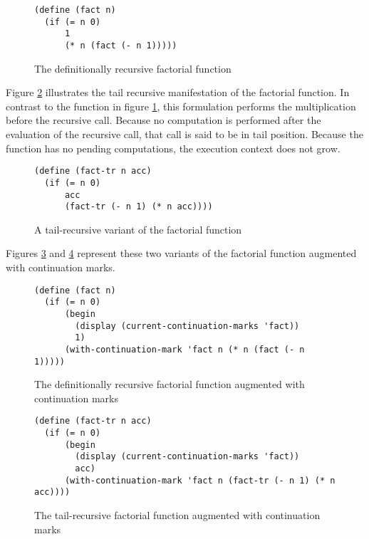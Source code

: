 \documentclass[ms]{byuprop}
\newcounter{definition}
\begin{document}
\begin{figure}
\begin{verbatim}
(define (fact n)
  (if (= n 0)
      1
      (* n (fact (- n 1)))))
\end{verbatim}
\caption{The definitionally recursive factorial function}
\label{fac-rec}
\end{figure}

Figure \ref{fac-tail-rec} illustrates the tail recursive manifestation of the factorial
function. In contrast to the function in figure \ref{fac-rec}, this formulation performs
the multiplication before the recursive call. Because no computation is performed after
the evaluation of the recursive call, that call is said to be in tail position. Because
the function has no pending computations, the execution context does not grow.

\begin{figure}
\begin{verbatim}
(define (fact-tr n acc)
  (if (= n 0)
      acc
      (fact-tr (- n 1) (* n acc))))
\end{verbatim}
\caption{A tail-recursive variant of the factorial function}
\label{fac-tail-rec}
\end{figure}

Figures \ref{fac-rec-cm} and \ref{fac-tail-rec-cm} represent these two variants of the
factorial function augmented with continuation marks.


\begin{figure}
\begin{verbatim}
(define (fact n)
  (if (= n 0)
      (begin
        (display (current-continuation-marks 'fact))
        1)
      (with-continuation-mark 'fact n (* n (fact (- n 1)))))
\end{verbatim}
\caption{The definitionally recursive factorial function augmented with continuation marks}
\label{fac-rec-cm}
\end{figure}

\begin{figure}
\begin{verbatim}
(define (fact-tr n acc)
  (if (= n 0)
      (begin
        (display (current-continuation-marks 'fact))
        acc)
      (with-continuation-mark 'fact n (fact-tr (- n 1) (* n acc))))
\end{verbatim}
\caption{The tail-recursive factorial function augmented with continuation marks}
\label{fac-tail-rec-cm}
\end{figure}
\end{document}
